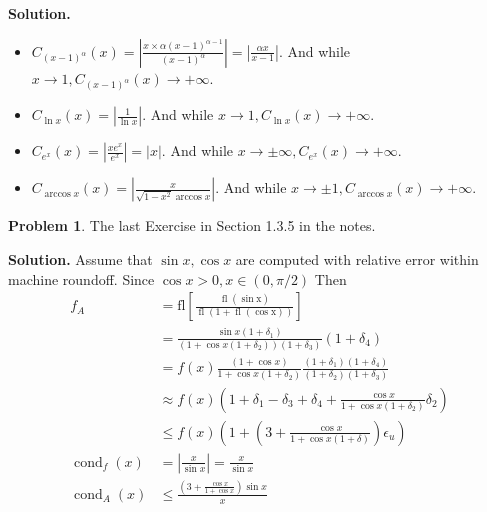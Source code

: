 \documentclass[a4paper]{book}
\newenvironment{solution}%
{\noindent\textbf{Solution.}}%
{\qedhere}
\numberwithin{equation}{chapter}
\theoremstyle{definition}
\newtheorem{pro}[exm]{Problem}
\begin{document}
\begin{solution}
  \begin{itemize}
  \item $C_{( x - 1)^\alpha}(x) = \left| \frac{x \times \alpha(x-1)^{\alpha-1}}{(x-1)^\alpha} \right| = \left| \frac{\alpha x}{x-1} \right|$. And while $x \rightarrow 1, C_{( x - 1)^\alpha}(x) \rightarrow +\infty$.

  \item $C_{\ln x}(x) = \left|  \frac{1}{\ln x} \right|$. And while $x \rightarrow 1, C_{\ln x}(x) \rightarrow +\infty$.

  \item $C_{e^x}(x) = \left| \frac{x e^x}{e^x} \right| = \left| x \right|$. And while $x \rightarrow \pm \infty, C_{e^x}(x) \rightarrow +\infty$.

    \item $C_{\arccos x}(x) = \left| \frac{x}{\sqrt{1 -x^2} \arccos x} \right|$. And while $x \rightarrow \pm 1, C_{\arccos x}(x) \rightarrow +\infty$.
  \end{itemize}
\end{solution}

\begin{pro}
  The last Exercise in Section 1.3.5 in the notes.
\end{pro}

\begin{solution}
  Assume that $\sin x, \cos x$ are computed with relative error within machine roundoff. Since $\cos x > 0, x \in (0, \pi/2)$ Then
  \begin{align*}
    f_A &= \operatorname{fl\left[ \frac{\operatorname{fl}(\sin x)}{\operatorname{fl}( 1 + \operatorname{fl}(\cos x))} \right]} \\
        &= \frac{\sin x(1 + \delta_1)}{(1 + \cos x(1 + \delta_2))( 1 + \delta_3)}( 1 + \delta_4) \\
        &= f(x) \frac{(1 + \cos x)}{ 1 +  \cos x( 1 + \delta_2)} \frac{(1 + \delta_1)(1 + \delta_4)}{(1 + \delta_2)( 1+ \delta_3)} \\
    &\approx f(x)(1 + \delta_1 - \delta_3 + \delta_4 + \frac{\cos x}{1 + \cos x(1 + \delta_2)}\delta_2)\\
    & \leq f(x)( 1 + (3 + \frac{\cos x}{1 + \cos x(1 + \delta)}) \epsilon_u) \\
    \operatorname{cond}_f(x) &= \left| \frac{x}{\sin x} \right| = \frac{x}{\sin x} \\
    \operatorname{cond}_A(x) &\leq \frac{(3 + \frac{\cos x}{1 + \cos x}) \sin x}{x}
  \end{align*}
\end{solution}
\end{document}
